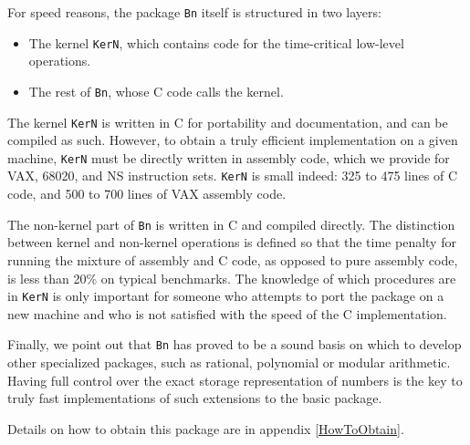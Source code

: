 For speed reasons, the package \verb+Bn+ itself is structured in two
layers: 
\begin{itemize}
 \item The kernel \verb+KerN+, which contains code for the time-critical 
low-level operations.
 \item The rest of \verb+Bn+, whose C code   calls  the kernel.
\end{itemize}

The kernel \verb+KerN+ is written in 
C for portability and documentation,  
and can be compiled as such. However, to obtain a truly efficient
implementation on a given machine, \verb+KerN+ must be directly written
in assembly code, which we provide for VAX, 68020, and NS instruction sets.
\verb+KerN+ is small indeed: 325 to 475 lines of C code, and 500 to 700 lines
of VAX assembly code.
 
The non-kernel part of \verb+Bn+ is written in C and compiled directly.
The distinction between kernel and non-kernel operations is defined so 
that the time penalty
for running the mixture of assembly and C code, 
as opposed to pure assembly code, is
less than 20\% on typical benchmarks. The knowledge of 
which procedures are
in \verb+KerN+ is only important for someone who attempts to port the
package on a new machine and who is not satisfied with the speed of the C
implementation.
 
Finally, we point out that \verb+Bn+ has proved to be a sound basis on
which to develop other specialized packages, such as rational,
polynomial or modular arithmetic. Having full control over the exact
storage representation of numbers is the key to truly fast
implementations of such extensions to the basic package.

Details on how to obtain this package are in appendix \ref{HowToObtain}.

\clearpage
